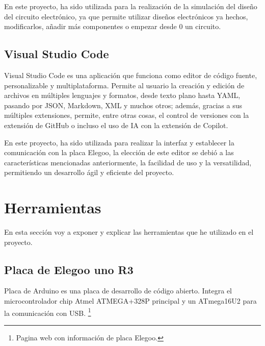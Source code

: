 En este proyecto, ha sido utilizada para la realización de la simulación del diseño del circuito electrónico, ya que permite utilizar diseños electrónicos ya hechos, modificarlos, añadir más componentes o empezar desde 0 un circuito.
\subsection{Visual Studio Code}
Visual Studio Code es una aplicación que funciona como editor de código fuente, personalizable y multiplataforma.
Permite al usuario la creación y edición de archivos en múltiples lenguajes y formatos, desde texto plano hasta YAML, pasando por JSON, Markdown, XML y muchos otros; además, gracias a sus múltiples extensiones, permite, entre otras cosas, el control de versiones con la extensión de GitHub o incluso el uso de IA con la extensión de Copilot.

En este proyecto, ha sido utilizada para realizar la interfaz y establecer la comunicación con la placa Elegoo, la elección de este editor se debió a las características mencionadas anteriormente, la facilidad de uso y la versatilidad, permitiendo un desarrollo ágil y eficiente del proyecto.

\section{Herramientas}
En esta sección voy a exponer y explicar las herramientas que he utilizado en el proyecto.
\subsection{Placa de Elegoo uno R3}
Placa de Arduino es una placa de desarrollo de código abierto. 
Integra el microcontrolador chip Atmel ATMEGA+328P principal y un ATmega16U2 para la comunicación con USB. \cite{Elegoo}\footnote{Pagina web con información de placa Elegoo\cite{Elegoo}.}

